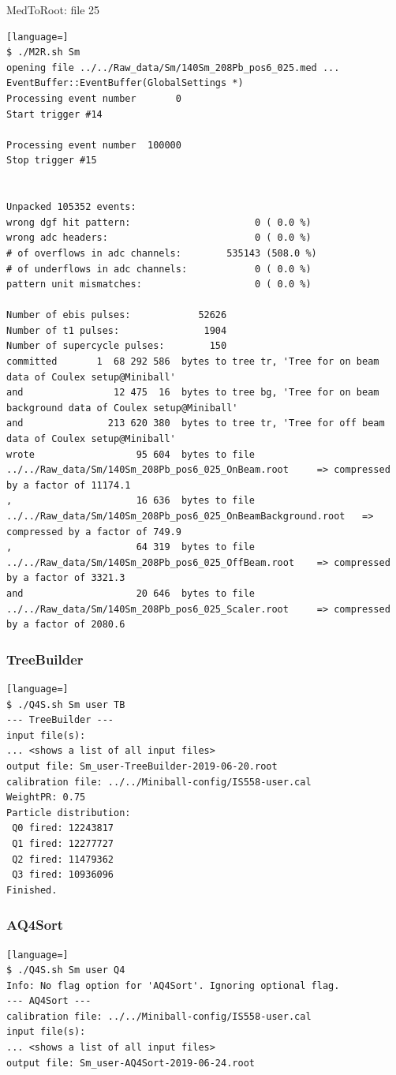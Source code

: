 \documentclass[twoside,english]{uiofysmaster/uiofysmaster}
\begin{document}
MedToRoot: file 25
\begin{lstlisting}[language=]
$ ./M2R.sh Sm
opening file ../../Raw_data/Sm/140Sm_208Pb_pos6_025.med ...
EventBuffer::EventBuffer(GlobalSettings *)
Processing event number       0
Start trigger #14

Processing event number  100000
Stop trigger #15


Unpacked 105352 events:
wrong dgf hit pattern:                      0 ( 0.0 %)
wrong adc headers:                          0 ( 0.0 %)
# of overflows in adc channels:        535143 (508.0 %)
# of underflows in adc channels:            0 ( 0.0 %)
pattern unit mismatches:                    0 ( 0.0 %)

Number of ebis pulses:            52626
Number of t1 pulses:               1904
Number of supercycle pulses:        150
committed       1  68 292 586  bytes to tree tr, 'Tree for on beam data of Coulex setup@Miniball'
and                12 475  16  bytes to tree bg, 'Tree for on beam background data of Coulex setup@Miniball'
and               213 620 380  bytes to tree tr, 'Tree for off beam data of Coulex setup@Miniball'
wrote                  95 604  bytes to file ../../Raw_data/Sm/140Sm_208Pb_pos6_025_OnBeam.root 	=> compressed by a factor of 11174.1
,                      16 636  bytes to file ../../Raw_data/Sm/140Sm_208Pb_pos6_025_OnBeamBackground.root 	=> compressed by a factor of 749.9
,                      64 319  bytes to file ../../Raw_data/Sm/140Sm_208Pb_pos6_025_OffBeam.root 	=> compressed by a factor of 3321.3
and                    20 646  bytes to file ../../Raw_data/Sm/140Sm_208Pb_pos6_025_Scaler.root 	=> compressed by a factor of 2080.6
\end{lstlisting}

\bigskip

\subsubsection{TreeBuilder}
\begin{lstlisting}[language=]
$ ./Q4S.sh Sm user TB
--- TreeBuilder ---
input file(s):
... <shows a list of all input files>
output file: Sm_user-TreeBuilder-2019-06-20.root
calibration file: ../../Miniball-config/IS558-user.cal
WeightPR: 0.75
Particle distribution:
 Q0 fired: 12243817
 Q1 fired: 12277727
 Q2 fired: 11479362
 Q3 fired: 10936096
Finished.
\end{lstlisting}


\subsubsection{AQ4Sort}
\begin{lstlisting}[language=]
$ ./Q4S.sh Sm user Q4
Info: No flag option for 'AQ4Sort'. Ignoring optional flag.
--- AQ4Sort ---
calibration file: ../../Miniball-config/IS558-user.cal
input file(s):
... <shows a list of all input files>
output file: Sm_user-AQ4Sort-2019-06-24.root
\end{lstlisting}
\end{document}

